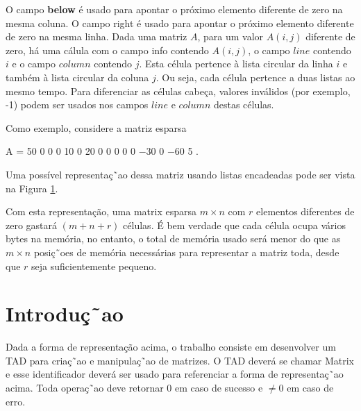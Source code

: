 O campo \textbf{below} é usado para apontar o próximo elemento diferente de zero na mesma coluna. O campo right é usado para apontar o próximo elemento diferente de zero na mesma linha. Dada uma matriz $A$, para um valor $A(i, j)$ diferente de zero, há uma cálula com o campo info contendo $A(i, j)$, o campo $line$ contendo $i$ e o campo $column$ contendo $j$. Esta célula pertence à lista circular da linha $i$ e também à lista circular da coluna $j$. Ou seja, cada célula pertence a duas listas ao mesmo tempo. Para diferenciar as células cabeça, valores inválidos (por exemplo, -1) podem ser usados nos campos $line$ e $column$ destas células.

Como exemplo, considere a matriz esparsa

A =
50 0 0 0
10 0 20 0
0 0 0 0
−30 0 −60 5
.

Uma possível representaç˜ao dessa matriz usando listas encadeadas pode ser vista na Figura \ref{fig_matrix}.

\begin{figure}[htp]
\label{fig_matrix}
\end{figure}



Com esta representação, uma matrix esparsa $m \times n$ com $r$ elementos diferentes de zero gastará $(m + n + r)$ células. É bem verdade que cada célula ocupa vários bytes na memória, no entanto, o total de memória usado será menor do que as $m \times n$ posiç˜oes de memória necessárias para representar a matriz toda, desde que $r$ seja suficientemente pequeno.


\section*{Introduç˜ao}

Dada a forma de representação acima, o trabalho consiste em desenvolver um TAD para criaç˜ao e manipulaç˜ao de matrizes. O TAD deverá se chamar Matrix e esse identificador deverá ser usado para referenciar a forma de representaç˜ao acima. Toda operaç˜ao deve retornar $0$ em caso de sucesso e $\neq 0$ em caso de erro.
